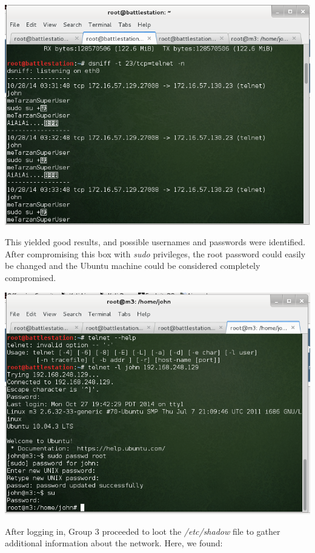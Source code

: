 \includegraphics[scale=0.5]{telnet.png}

This yielded good results, and possible usernames and passwords were identified. After compromising this box with \textit{sudo} privileges, the root password could easily be changed and the Ubuntu machine could be considered completely compromised. 

\includegraphics[scale=0.5]{pwnd.png}

After logging in, Group 3 proceeded to loot the \textit{/etc/shadow} file to gather additional information about the network. Here, we found:


